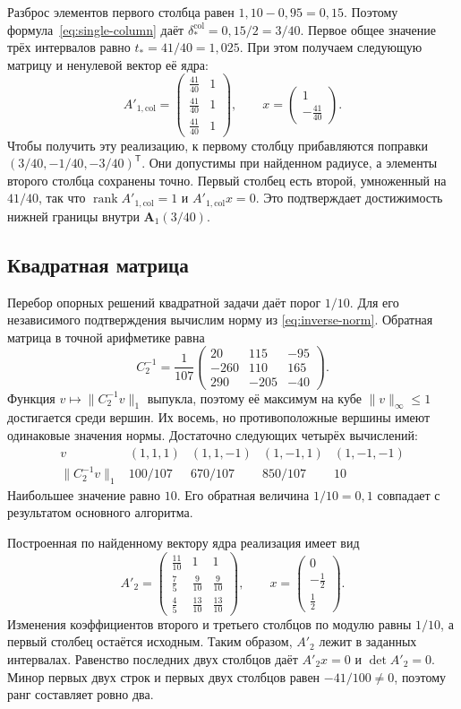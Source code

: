 \documentclass[12pt,a4paper]{article}
\newcommand{\rank}{\operatorname{rank}}
\begin{document}
Разброс элементов первого столбца равен $1{,}10-0{,}95=0{,}15$.
Поэтому формула~\eqref{eq:single-column} даёт
$\delta_*^{\mathrm{col}}=0{,}15/2=3/40$.
Первое общее значение трёх интервалов равно $t_*=41/40=1{,}025$.
При этом получаем следующую матрицу и ненулевой вектор её ядра:
\[
A'_{1,\mathrm{col}}=
\begin{pmatrix}
\frac{41}{40}&1\\
\frac{41}{40}&1\\
\frac{41}{40}&1
\end{pmatrix},
\qquad
x=\begin{pmatrix}1\\-\frac{41}{40}\end{pmatrix}.
\]
Чтобы получить эту реализацию, к первому столбцу прибавляются
поправки $(3/40,-1/40,-3/40)^\mathsf T$.
Они допустимы при найденном радиусе, а элементы второго столбца
сохранены точно. Первый столбец есть второй, умноженный на $41/40$,
так что $\rank A'_{1,\mathrm{col}}=1$ и $A'_{1,\mathrm{col}}x=0$.
Это подтверждает достижимость нижней границы внутри
$\boldsymbol A_1(3/40)$.

\subsection{Квадратная матрица}

Перебор опорных решений квадратной задачи даёт порог $1/10$.
Для его независимого подтверждения вычислим норму из
\eqref{eq:inverse-norm}. Обратная матрица в точной арифметике равна
\[
C_2^{-1}=\frac1{107}
\begin{pmatrix}
20&115&-95\\
-260&110&165\\
290&-205&-40
\end{pmatrix}.
\]
Функция $v\mapsto\|C_2^{-1}v\|_1$ выпукла, поэтому её максимум
на кубе $\|v\|_\infty\leq1$ достигается среди вершин.
Их восемь, но противоположные вершины имеют одинаковые значения
нормы. Достаточно следующих четырёх вычислений:
\[
\begin{array}{c|cccc}
v&(1,1,1)&(1,1,-1)&(1,-1,1)&(1,-1,-1)\\ \hline
\|C_2^{-1}v\|_1&100/107&670/107&850/107&10
\end{array}
\]
Наибольшее значение равно $10$. Его обратная величина $1/10=0{,}1$
совпадает с результатом основного алгоритма.

Построенная по найденному вектору ядра реализация имеет вид
\[
A'_2=
\begin{pmatrix}
\frac{11}{10}&1&1\\
\frac75&\frac9{10}&\frac9{10}\\
\frac45&\frac{13}{10}&\frac{13}{10}
\end{pmatrix},
\qquad
x=\begin{pmatrix}0\\-\frac12\\\frac12\end{pmatrix}.
\]
Изменения коэффициентов второго и третьего столбцов по модулю
равны $1/10$, а первый столбец остаётся исходным.
Таким образом, $A'_2$ лежит в заданных интервалах.
Равенство последних двух столбцов даёт $A'_2x=0$ и $\det A'_2=0$.
Минор первых двух строк и первых двух столбцов равен $-41/100\ne0$,
поэтому ранг составляет ровно два.
\end{document}
